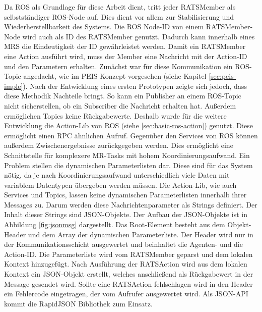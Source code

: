 Da ROS als Grundlage für diese Arbeit dient, tritt jeder RATSMember als selbstständiger ROS-Node auf. Dies dient vor allem zur Stabilisierung und Wiederherstellbarkeit des Systems. Die ROS Node-ID von einem RATSMember-Node wird auch als ID des RATSMember genutzt. Dadurch kann innerhalb eines MRS die Eindeutigkeit der ID gewährleistet werden. Damit ein RATSMember eine Action ausführt wird, muss der Member eine Nachricht mit der Action-ID und den Parametern erhalten. Zunächst war für diese Kommunikation ein ROS-Topic angedacht, wie im PEIS Konzept vorgesehen (siehe Kapitel \ref{sec:peis-imple}). Nach der Entwicklung eines ersten Prototypen zeigte sich jedoch, dass diese Methodik Nachteile bringt. So kann ein Publisher an einem ROS-Topic nicht sicherstellen, ob ein Subscriber die Nachricht erhalten hat. Außerdem ermöglichen Topics keine Rückgabewerte. Deshalb wurde für die weitere Entwicklung die Action-Lib von ROS (siehe \ref{sec:basic-ros-action}) genutzt. Diese ermöglicht einen RPC ähnlichen Aufruf. Gegenüber den Services von ROS können außerdem Zwischenergebnisse zurückgegeben werden. Dies ermöglicht eine Schnittstelle für komplexere MR-Tasks mit hohem Koordinierungsaufwand. Ein Problem stellen die dynamischen Parameterlisten dar. Diese sind für das System nötig, da je nach Koordinierungsaufwand unterschiedlich viele Daten mit variablem Datentypen übergeben werden müssen. Die Action-Lib, wie auch Services und Topics, lassen keine dynamischen Parameterlisten innerhalb ihrer Messages zu. Darum werden diese Nachrichtenparameter als Strings definiert. Der Inhalt dieser Strings sind JSON-Objekte. Der Aufbau der JSON-Objekte ist in Abbildung \ref{fig:jsonmsg} dargestellt. Das Root-Element besteht aus dem Objekt-Header und dem Array der dynamischen Parameterliste. Der Header wird nur in der Kommunikationsschicht ausgewertet und beinhaltet die Agenten- und die Action-ID. Die Parameterliste wird vom RATSMember geparst und dem lokalen Kontext hinzugefügt. Nach Ausführung der RATSAction wird aus dem lokalen Kontext ein JSON-Objekt erstellt, welches anschließend als Rückgabewert in der Message gesendet wird. Sollte eine RATSAction fehlschlagen wird in den Header ein Fehlercode eingetragen, der vom Aufrufer ausgewertet wird. Als JSON-API kommt die RapidJSON Bibliothek zum Einsatz.

